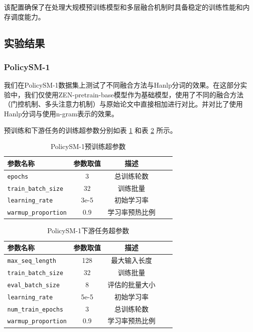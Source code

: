 \documentclass[12pt, a4paper]{ctexart}
\begin{document}
该配置确保了在处理大规模预训练模型和多层融合机制时具备稳定的训练性能和内存调度能力。

\subsection{实验结果}
\subsubsection{PolicySM-1}
我们在PolicySM-1数据集上测试了不同融合方法与Hanlp分词的效果。在这部分实验中，我们仅使用ZEN-pretrain-base模型作为基础模型，使用了不同的融合方法（门控机制、多头注意力机制）与原始论文中直接相加进行对比。并对比了使用Hanlp分词与使用n-gram表示的效果。

预训练和下游任务的训练超参数分别如表 \ref{tab:pretrain_hyperparameters_1} 和表 \ref{tab:seqlevel_hyperparameters_1} 所示。


\begin{table}[H]
    \centering
    \begin{tabular}{lcccc}
        \toprule
        \textbf{参数名称} & \textbf{参数取值} & \textbf{描述} \\
        \midrule
        \texttt{epochs} & 3 & 总训练轮数 \\ 
        \texttt{train\_batch\_size} & 32 & 训练批量 \\
        \texttt{learning\_rate} & 3e-5 & 初始学习率 \\ 
        \texttt{warmup\_proportion} & 0.9 & 学习率预热比例 \\ 
        \bottomrule
    \end{tabular}
    \caption{PolicySM-1预训练超参数}
    \label{tab:pretrain_hyperparameters_1}
\end{table}

\begin{table}[H]
    \centering
    \begin{tabular}{lcccc}
        \toprule
        \textbf{参数名称} & \textbf{参数取值} & \textbf{描述} \\ 
        \midrule
        \texttt{max\_seq\_length} & 128 & 最大输入长度\\ 
        \texttt{train\_batch\_size} & 32 & 训练批量 \\ 
        \texttt{eval\_batch\_size} & 8 & 评估的批量大小 \\
        \texttt{learning\_rate} & 5e-5 & 初始学习率 \\
        \texttt{num\_train\_epochs} & 3 & 总训练轮数 \\ 
        \texttt{warmup\_proportion} & 0.9 & 学习率预热比例 \\
        \bottomrule
    \end{tabular}
    \caption{PolicySM-1下游任务超参数}
    \label{tab:seqlevel_hyperparameters_1}
\end{table}
\end{document}
